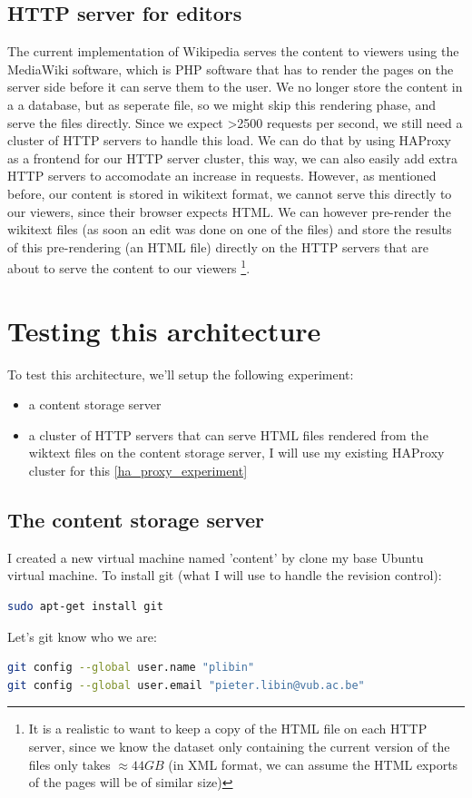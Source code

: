 \documentclass[12pt]{report}
\begin{document}
\subsection{HTTP server for editors}
The current implementation of Wikipedia serves the content to viewers
using the MediaWiki software, which is PHP software that has to render
the pages on the server side before it can serve them to the user.
We no longer store the content in a a database, but as seperate file, so
we might skip this rendering phase, and serve the files directly.
Since we expect >2500 requests per second, we still need a cluster of
HTTP servers to handle this load. We can do that by using HAProxy as a 
frontend for our HTTP server cluster, this way, we can also easily add
extra HTTP servers to accomodate an increase in requests.
However, as mentioned before, our content is stored in wikitext
format, we cannot serve this directly to our viewers, since their
browser expects HTML. We can however pre-render the wikitext files (as
soon an edit was done on one of the files) and store the results of
this pre-rendering (an HTML file) directly on the HTTP servers that
are about to serve the content to our viewers \footnote{It is a
  realistic to want to keep a copy of the HTML file on each HTTP server,
since we know the dataset only containing the current version of
the files only takes $\approx 44GB$ (in XML format, we can assume the
HTML exports of the pages will be of similar size)}.

\section{Testing this architecture}
To test this architecture, we'll setup the following experiment:
\begin{itemize}
\item a content storage server 
\item a cluster of HTTP servers that can serve HTML files rendered from
the wiktext files on the content storage server, I will use my
existing HAProxy cluster for this \ref{ha_proxy_experiment}
\end{itemize}

\subsection{The content storage server}
I created a new virtual machine named 'content' by clone my base
Ubuntu virtual machine.
To install git (what I will use to handle the revision control):
\begin{lstlisting}[language=bash]
sudo apt-get install git
\end{lstlisting}
Let's git know who we are:
\begin{lstlisting}[language=bash]
git config --global user.name "plibin"
git config --global user.email "pieter.libin@vub.ac.be"
\end{lstlisting}
\end{document}
